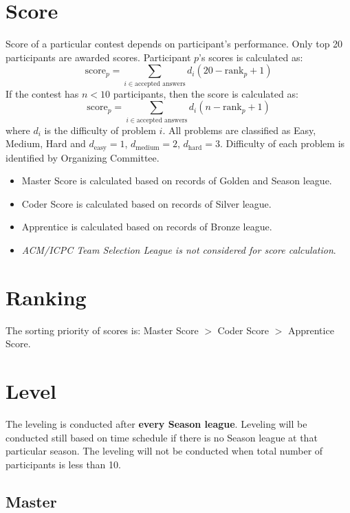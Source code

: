 \documentclass{article}
\begin{document}
\section{Score}

Score of a particular contest depends on participant's performance. Only top 20 participants are awarded scores. Participant $p$'s scores is calculated as:
\begin{equation*}
	\text{score}_{p}=\sum_{i\in\text{accepted answers}}d_{i}(20-\text{rank}_{p}+1)
\end{equation*}
If the contest has $n<10$ participants, then the score is calculated as:
\begin{equation*}
	\text{score}_{p}=\sum_{i\in\text{accepted answers}}d_{i}(n-\text{rank}_{p}+1)
\end{equation*}
where $d_{i}$ is the difficulty of problem $i$. All problems are classified as Easy, Medium, Hard and $d_{\text{easy}}=1$, $d_{\text{medium}}=2$, $d_{\text{hard}}=3$. Difficulty of each problem is identified by Organizing Committee.

\begin{itemize}
	\item Master Score is calculated based on records of Golden and Season league.
	\item Coder Score is calculated based on records of Silver league.
	\item Apprentice is calculated based on records of Bronze league.
	\item \emph{ACM/ICPC Team Selection League is not considered for score calculation}.
\end{itemize}

\section{Ranking}

The sorting priority of scores is: Master Score $>$ Coder Score $>$ Apprentice Score.

\section{Level}

The leveling is conducted after \textbf{every Season league}. Leveling will be conducted still based on time schedule if there is no Season league at that particular season. The leveling will not be conducted when total number of participants is less than 10.

\subsection{Master}
\end{document}
